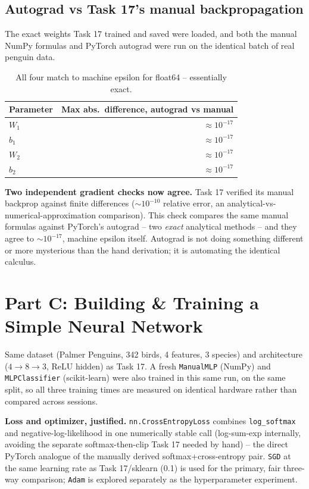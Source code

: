 \documentclass[11pt,a4paper]{article}
\begin{document}
\subsection*{Autograd vs Task 17's manual backpropagation}

The exact weights Task 17 trained and saved were loaded, and both the manual NumPy
formulas and PyTorch autograd were run on the identical batch of real penguin data.

\begin{table}[H]
\centering
\begin{tabular}{lr}
\toprule
\textbf{Parameter} & \textbf{Max abs.\ difference, autograd vs manual} \\
\midrule
$W_1$ & $\approx 10^{-17}$ \\
$b_1$ & $\approx 10^{-17}$ \\
$W_2$ & $\approx 10^{-17}$ \\
$b_2$ & $\approx 10^{-17}$ \\
\bottomrule
\end{tabular}
\caption{All four match to machine epsilon for float64 -- essentially exact.}
\end{table}

\textbf{Two independent gradient checks now agree.} Task 17 verified its manual
backprop against finite differences ($\sim10^{-10}$ relative error, an
analytical-vs-numerical-approximation comparison). This check compares the same manual
formulas against PyTorch's autograd -- two \emph{exact} analytical methods -- and they
agree to $\sim10^{-17}$, machine epsilon itself. Autograd is not doing something
different or more mysterious than the hand derivation; it is automating the identical
calculus.

\section*{Part C: Building \& Training a Simple Neural Network}

Same dataset (Palmer Penguins, 342 birds, 4 features, 3 species) and architecture
($4 \to 8 \to 3$, ReLU hidden) as Task 17. A fresh \texttt{ManualMLP} (NumPy) and
\texttt{MLPClassifier} (scikit-learn) were also trained in this same run, on the same
split, so all three training times are measured on identical hardware rather than
compared across sessions.

\textbf{Loss and optimizer, justified.} \texttt{nn.CrossEntropyLoss} combines
\texttt{log\_softmax} and negative-log-likelihood in one numerically stable call
(log-sum-exp internally, avoiding the separate softmax-then-clip Task 17 needed by
hand) -- the direct PyTorch analogue of the manually derived softmax+cross-entropy
pair. \texttt{SGD} at the same learning rate as Task 17/sklearn (0.1) is used for the
primary, fair three-way comparison; \texttt{Adam} is explored separately as the
hyperparameter experiment.
\end{document}
